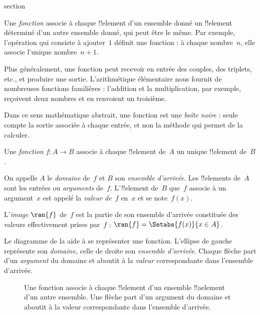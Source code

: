 \documentclass[11pt,a4paper,openany]{memoir}
\begin{document}


\begingroup
\expandafter\def\csname ol@sectioncs\endcsname{section}
\def\olfilename{function-basics}



\begin{explain}
Une \emph{fonction} associe à chaque !!{element} d’un ensemble donné
un !!{element} déterminé d’un autre ensemble donné, qui peut être le même.
Par exemple, l’opération qui consiste à ajouter~$1$ définit une fonction :
à chaque nombre~$n$, elle associe l’unique nombre~$n+1$.

Plus généralement, une fonction peut recevoir en entrée des couples,
des triplets, etc., et produire une sortie. L’arithmétique élémentaire
nous fournit de nombreuses fonctions familières : l’addition et la
multiplication, par exemple, reçoivent deux nombres et en renvoient un troisième.

Dans ce sens mathématique abstrait, une fonction est une \emph{boîte noire} :
seule compte la sortie associée à chaque entrée, et non la méthode
qui permet de la calculer.
\end{explain}

\begin{defn}[Fonction]
Une \emph{fonction} $f \colon A \to B$ associe à chaque !!{element}
de~$A$ un unique !!{element} de~$B$.

On appelle $A$ le \emph{domaine} de~$f$ et $B$ son \emph{ensemble d’arrivée}.
Les !!{element}s de~$A$ sont les entrées ou \emph{arguments} de~$f$.
L’!!{element} de~$B$ que~$f$ associe à un argument~$x$ est appelé
la \emph{valeur de~$f$} en~$x$ et se note~$f(x)$.

L’\emph{image} $\ran{f}$ de~$f$ est la partie de son ensemble d’arrivée
constituée des valeurs effectivement prises par~$f$ :
$\ran{f} = \Setabs{f(x)}{x \in A}$.
\end{defn}

Le diagramme de la  aide à se représenter une fonction.
L’ellipse de gauche représente son \emph{domaine}, celle de droite
son \emph{ensemble d’arrivée}. Chaque flèche part d’un \emph{argument}
du domaine et aboutit à la \emph{valeur} correspondante dans l’ensemble d’arrivée.

\begin{figure}
  \caption{Une fonction associe à chaque !!{element} d’un ensemble
    !!a{element} d’un autre ensemble. Une flèche part d’un argument
    du domaine et aboutit à la valeur correspondante dans l’ensemble d’arrivée.}
\end{figure}
\end{document}
